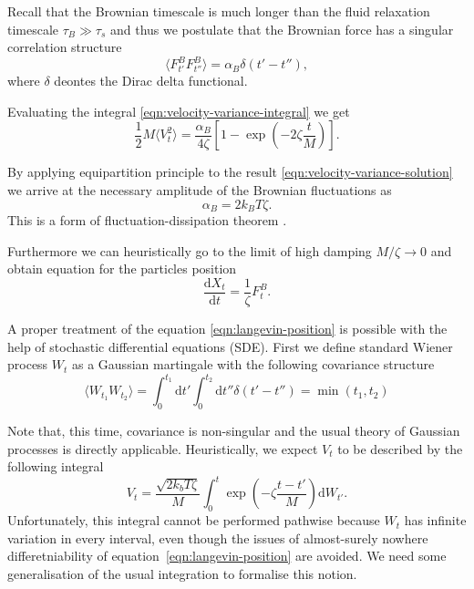 \documentclass{doctoral}
\newcommand{\dd}{\mathrm{d}}
\begin{document}
Recall that the Brownian timescale is much longer than the fluid relaxation timescale $\tau_B \gg \tau_s$ and thus we postulate that the Brownian force has a singular correlation structure
\begin{equation}
    \langle F_{t'}^B F_{t''}^B \rangle = \alpha_B \delta(t'-t''), \label{eqn:white-noise-langevin}
\end{equation}
where $\delta$ deontes the Dirac delta functional.

Evaluating the integral \eqref{eqn:velocity-variance-integral} we get
\begin{equation}
    \frac{1}{2} M \langle V_t^2 \rangle = \frac{\alpha_B}{4 \zeta} \left[ 1 - \exp \left(-2\zeta \frac{t}{M} \right) \right].
    \label{eqn:velocity-variance-solution}
\end{equation}

By applying equipartition principle to the result \eqref{eqn:velocity-variance-solution} we arrive at the necessary amplitude of the Brownian fluctuations as
\begin{equation}
    \alpha_B = 2 k_B T \zeta.
    \label{eqn:fluctuation-dissipation-raighley-particle}
\end{equation}
This is a form of fluctuation-dissipation theorem \cite{van_Kampen_1984,Ottinger_2012}.

Furthermore we can heuristically go to the limit of high damping $M/\zeta \to 0$ and obtain equation for the particles position
\begin{equation}
    \frac{\dd X_t}{\dd t} = \frac{1}{\zeta} F_t^B.
    \label{eqn:langevin-position}
\end{equation}

A proper treatment of the equation \eqref{eqn:langevin-position} is possible with the help of stochastic differential equations (SDE).
First we define standard Wiener process $W_t$ as a Gaussian martingale with the following covariance structure
\begin{equation}
    \langle W_{t_1} W_{t_2} \rangle = \int_0^{t_1} \dd t' \int_0^{t_2} \dd t'' \delta(t' - t'') = \min(t_1, t_2) \label{eqn:wiener-process-definition}
\end{equation}

Note that, this time, covariance is non-singular and the usual theory of Gaussian processes is directly applicable.
Heuristically, we expect $V_t$ to be described by the following integral
\begin{equation}
    V_t = \frac{\sqrt{2 k_b T \zeta}}{M} \int_0^t \exp\left( -\zeta\frac{t - t'}{M} \right) \dd W_{t'}.
    \label{eqn:velocity-integral-sde}
\end{equation}
Unfortunately, this integral cannot be performed pathwise because $W_t$ has infinite variation in every interval, even though the issues of almost-surely nowhere differetniability of equation~\eqref{eqn:langevin-position} are avoided.
We need some generalisation of the usual integration to formalise this notion.
\end{document}
